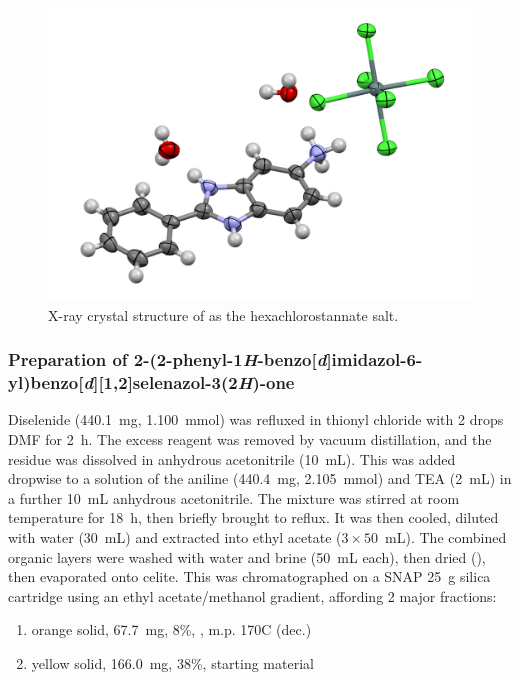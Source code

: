 \begin{refsection}
\begin{figure}[ht]
    \centering
    \includegraphics[width=0.8\linewidth]{Figures/rhs-amine-xray.pdf}
    \caption{X-ray crystal structure of  as the hexachlorostannate salt.}
    \label{fig:rhs-amine-xray}
\end{figure}

\subsubsection[Preparation of \refcmpd{ebs-rhs-ph}]{Preparation of 2-(2-phenyl-1\emph{H}-benzo[\emph{d}]imidazol-6-yl)benzo[\emph{d}][1,2]\-selenazol-3(2\emph{H})-one }
Diselenide  (440.1~mg, 1.100~mmol) was refluxed in thionyl chloride with 2 drops DMF for 2~h.
The excess reagent was removed by vacuum distillation, and the residue was dissolved in anhydrous acetonitrile (10~mL).
This was added dropwise to a solution of the aniline  (440.4~mg, 2.105~mmol) and TEA (2~mL) in a further 10~mL anhydrous acetonitrile.
The mixture was stirred at room temperature for 18~h, then briefly brought to reflux.
It was then cooled, diluted with water (30~mL) and extracted into ethyl acetate ($3\times50$~mL).
The combined organic layers were washed with water and brine (50~mL each), then dried (), then evaporated onto celite.
This was chromatographed on a SNAP 25~g silica cartridge using an ethyl acetate/methanol gradient, affording 2 major fractions:
\begin{enumerate}
    \item orange solid, 67.7~mg, 8\%, , m.p. 170\degree C (dec.)
    \item yellow solid, 166.0~mg, 38\%, starting material 
\end{enumerate}


\end{refsection}
